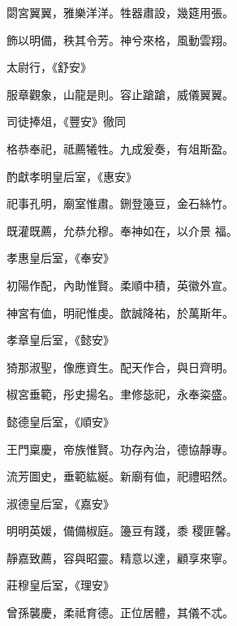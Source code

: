 \begin{pinyinscope}
 閟宮翼翼，雅樂洋洋。牲器肅設，幾筵用張。



 飾以明備，秩其令芳。神兮來格，風動雲翔。



 太尉行，《舒安》



 服章觀象，山龍是則。容止蹌蹌，威儀翼翼。



 司徒捧俎，《豐安》徹同



 格恭奉祀，祗薦犧牲。九成爰奏，有俎斯盈。



 酌獻孝明皇后室，《惠安》



 祀事孔明，廟室惟肅。鉶登籩豆，金石絲竹。



 既灌既薦，允恭允穆。奉神如在，以介景
 福。



 孝惠皇后室，《奉安》



 初陽作配，內助惟賢。柔順中積，英徽外宣。



 神宮有侐，明祀惟虔。歆誠降祐，於萬斯年。



 孝章皇后室，《懿安》



 猗那淑聖，像應資生。配天作合，與日齊明。



 椒宮垂範，彤史揚名。聿修毖祀，永奉粢盛。



 懿德皇后室，《順安》



 王門稟慶，帝族惟賢。功存內治，德協靜專。



 流芳圖史，垂範紘綖。新廟有侐，祀禮昭然。



 淑德皇后室，《嘉安》



 明明英媛，備備椒庭。籩豆有踐，黍
 稷匪馨。



 靜嘉致薦，容與昭靈。精意以達，顧享來寧。



 莊穆皇后室，《理安》



 曾孫襲慶，柔祗育德。正位居體，其儀不忒。




\end{pinyinscope}
